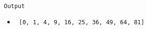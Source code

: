 \begin{center}
\texttt{Output}
\end{center}
\begin{itemize}
\item\texttt{ [0, 1, 4, 9, 16, 25, 36, 49, 64, 81] }
\end{itemize}
